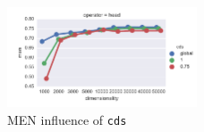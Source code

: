 \begin{figure}
  \centering

  \includegraphics[width=0.5\textwidth]{supplement/figures/men-interaction-cds}

  \caption{MEN influence of \texttt{cds}}
  \label{fig:men-cds}
\end{figure}
